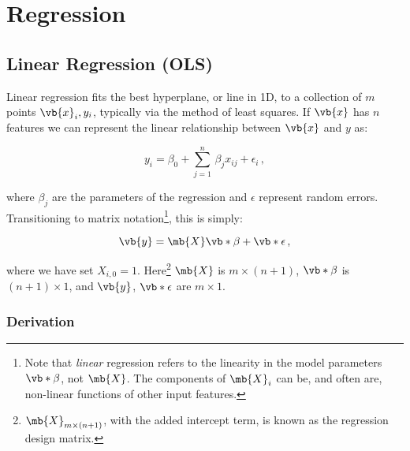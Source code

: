\chapter{Regression}
\label{chap:regression}

\section{Linear Regression (OLS)}
\label{regression:linear}

Linear regression fits the best hyperplane, or line in 1D,
to a collection of $m$ points $\vb{x}_{i}, y_{i}$,
typically via the method of least squares.
If $\vb{x}$ has $n$ features we can represent the
linear relationship between $\vb{x}$ and $y$ as:

\begin{equation}\label{eq:linear:one_point}
y_{i} = \beta_{0} + \sum_{j=1}^{n}\, \beta_{j} x_{ij} + \epsilon_{i}\,,
\end{equation}

\noindent where $\beta_{j}$ are the parameters of the regression
and $\epsilon$ represent random errors.
Transitioning to matrix notation\footnote{Note
that \textit{linear} regression refers to the linearity in the model parameters
$\vb*{\beta}$, not $\mb{X}$.
The components of $\mb{X}_{i}$ can be, and often are,
non-linear functions of other input features.}, this is simply:

\begin{equation}\label{eq:linear:matrix}
\vb{y} = \mb{X} \vb*{\beta} + \vb*{\epsilon}\,,
\end{equation}

\noindent where we have set $X_{i,0} = 1$.
Here\footnote{$\mb{X}_{m \times \left(n+1\right)}$,
with the added intercept term,
is known as the regression design matrix.} $\mb{X}$ is $m \times \left(n+1\right)$,
$\vb*{\beta}$ is $\left(n+1\right) \times 1$,
and $\vb{y}$, $\vb*{\epsilon}$ are $m \times 1$.

\subsection{Derivation}
\label{regression:linear:derivation}

